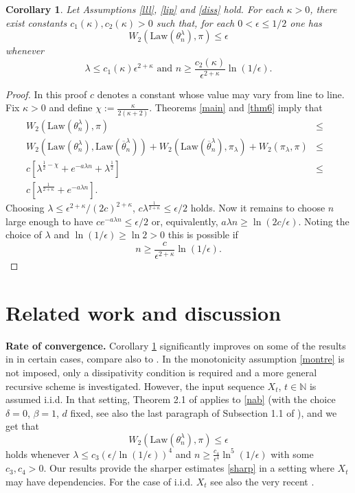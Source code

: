 \documentclass[a4paper]{article}
\newtheorem{corollary}[theorem]{Corollary}
\begin{document}
\begin{corollary}\label{dros}
Let Assumptions \ref{lll}, \ref{lip} and \ref{diss} hold.  For each $\kappa>0$, there exist constants $c_1(\kappa),c_2(\kappa)>0$ such that, for each
	$0<\epsilon\leq 1/2$ one has
	$$
	W_2(\mathrm{Law}(\theta^{\lambda}_n),\pi)\leq \epsilon
	$$
	whenever
	\begin{equation}\label{sharp}
	\lambda\leq  c_1(\kappa)\epsilon^{2+\kappa}\mbox{ and }n\geq
	\frac{c_2(\kappa)}{\epsilon^{2+\kappa}}\ln(1/\epsilon).
	\end{equation}
\end{corollary}
\begin{proof} In this proof $c$ denotes a constant whose value may vary from line
to line. Fix $\kappa>0$ and define $\chi:=\frac{\kappa}{2(\kappa+2)}$.
Theorems \ref{main} and \ref{thm6} imply that
\begin{eqnarray*}
W_2(\mathrm{Law}(\theta^{\lambda}_n),\pi) &\leq&\\
W_2(\mathrm{Law}(\theta^{\lambda}_n),\mathrm{Law}(\overline{\theta}^{\lambda}_n))+
W_2(\mathrm{Law}(\overline{\theta}^{\lambda}_n),\pi_{\lambda})+
W_2(\pi_{\lambda},\pi) &\leq&\\
c[\lambda^{\frac{1}{2}-\chi}+e^{-a\lambda n}+\lambda^{\frac{1}{2}}] &\leq&\\
c[\lambda^{\frac{1}{2+\kappa}}+e^{-a\lambda n}].
\end{eqnarray*}
Choosing $\lambda\leq \epsilon^{2+\kappa}/(2c)^{2+\kappa}$,
$c\lambda^{\frac{1}{2+\kappa}}\leq\epsilon/2$ holds. Now it remains
to choose $n$ large enough to have $ce^{-a\lambda n}\leq \epsilon/2$ or,
equivalently, $a\lambda n\geq \ln(2c/\epsilon)$. Noting the choice of $\lambda$
and $\ln(1/\epsilon)\geq \ln 2>0$ this is possible if
$$
n\geq\frac{c}{\epsilon^{2+\kappa}}\ln(1/\epsilon).
$$
\end{proof}

\section{Related work and discussion}\label{sec_diss}

\textbf{Rate of convergence.}
Corollary \ref{dros} significantly improves on some of the results in \cite{raginsky} in certain cases, compare also to \cite{xu}. In \cite{raginsky} the monotonicity assumption \eqref{montre} is not imposed, only a dissipativity condition is required and a more general recursive scheme is investigated. However, the input sequence $X_t$, $t\in\mathbb{N}$ is assumed i.i.d. In that setting, Theorem 2.1 of
		\cite{raginsky} applies to \eqref{nab} (with the choice $\delta=0$,
		$\beta=1$, $d$ fixed, see also the last paragraph of Subsection 1.1
		of \cite{raginsky}), and we get that
		$$
		W_2(\mathrm{Law}(\theta^{\lambda}_n),\pi)\leq \epsilon
		$$
		holds whenever
		$\lambda\leq c_3(\epsilon/\ln(1/\epsilon))^4$ and
		$n\geq \frac{c_4}{\epsilon^4}\ln^5(1/\epsilon)$ with some $c_3,c_4>0$.
		Our results provide the sharper estimates \eqref{sharp} in a setting where $X_t$ may have dependencies. For the case of i.i.d. $X_t$ see also the very
recent \cite{alex}.
\end{document}
